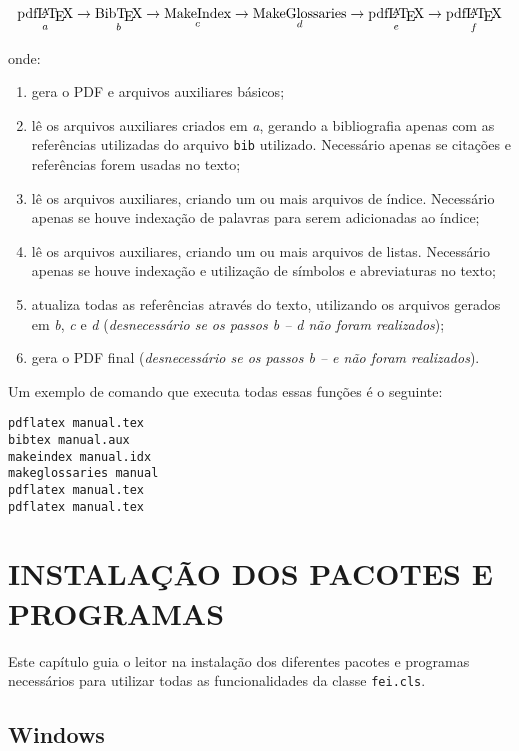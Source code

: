 \documentclass[xindy,draft]{fei}
\begin{document}
	\[\operatorname*{\text{pdf\LaTeX}}_a \to \operatorname*{\text{Bib\TeX}}_b \to \operatorname*{\text{MakeIndex}}_c \to \operatorname*{\text{MakeGlossaries}}_d \to \operatorname*{\text{pdf\LaTeX}}_e \to \operatorname*{\text{pdf\LaTeX}}_f\]
	
	onde:
	
	\begin{enumerate}
	\item gera o PDF e arquivos auxiliares básicos;
	\item lê os arquivos auxiliares criados em \emph{a}, gerando a bibliografia apenas com as referências utilizadas do arquivo \texttt{bib} utilizado. Necessário apenas se citações e referências forem usadas no texto;
	\item lê os arquivos auxiliares, criando um ou mais arquivos de índice. Necessário apenas se houve indexação de palavras para serem adicionadas ao índice;
	\item lê os arquivos auxiliares, criando um ou mais arquivos de listas. Necessário apenas se houve indexação e utilização de símbolos e abreviaturas no texto;
	\item atualiza todas as referências através do texto, utilizando os arquivos gerados em \emph{b}, \emph{c} e \emph{d} (\emph{desnecessário se os passos b -- d não foram realizados});
	\item gera o PDF final (\emph{desnecessário se os passos b -- e não foram realizados}).
	\end{enumerate}
	
	Um exemplo de comando que executa todas essas funções é o seguinte:
	
	\begin{verbatim}
pdflatex manual.tex
bibtex manual.aux
makeindex manual.idx
makeglossaries manual
pdflatex manual.tex
pdflatex manual.tex
	\end{verbatim}
	
	\chapter{INSTALAÇÃO DOS PACOTES E PROGRAMAS}	\label{chap:instalacao}
	
	Este capítulo guia o leitor na instalação dos diferentes pacotes e programas necessários para utilizar todas as funcionalidades da classe \texttt{fei.cls}.
	
	\section{Windows}
	
\end{document}
